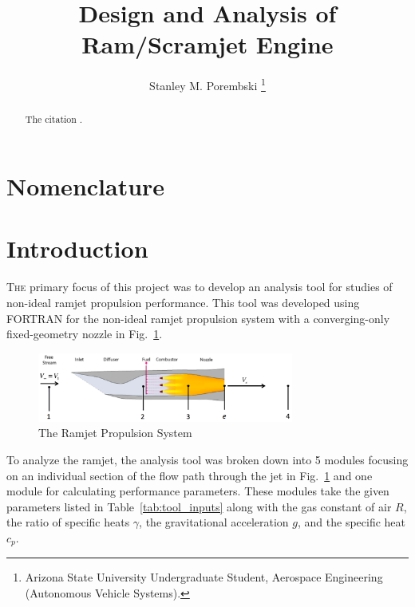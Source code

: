 \documentclass[conf]{new-aiaa} %
\title{Design and Analysis of Ram/Scramjet Engine}
\author{Stanley M. Porembski \footnote{Arizona State University Undergraduate Student, Aerospace Engineering (Autonomous Vehicle Systems).}}
\affil{Arizona State University Ira A. Schools of Engineering, Tempe, AZ, 85281}
\begin{document}
\maketitle

\begin{abstract}
The citation \cite{porembski2024github}.
\end{abstract}


\section*{Nomenclature}



\section{Introduction} \label{sec:introduction}
\lettrine{T}{he} primary focus of this project was to develop an analysis tool for studies of non-ideal ramjet propulsion performance. This tool was developed using FORTRAN for the non-ideal ramjet propulsion system with a converging-only fixed-geometry nozzle in Fig.~\ref{fig:propsys}.

\begin{figure}[H] %
    \centering
    \includegraphics[width=0.75\textwidth]{media/the_ramjet.png}
    \caption{\label{fig:propsys} The Ramjet Propulsion System}
\end{figure}

To analyze the ramjet, the analysis tool was broken down into 5 modules focusing on an individual section of the flow path through the jet in Fig.~\ref{fig:propsys} and one module for calculating performance parameters. These modules take the given parameters listed in Table~\ref{tab:tool_inputs} along with the gas constant of air $R$, the ratio of specific heats $\gamma$, the gravitational acceleration $g$, and the specific heat $c_p$.
\end{document}
